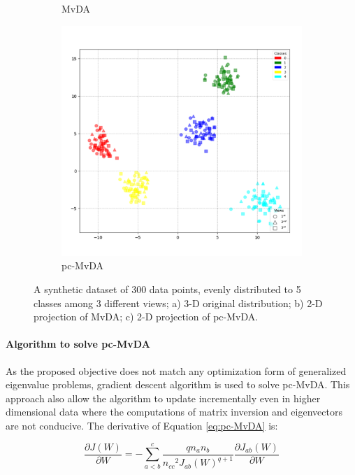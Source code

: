 \begin{figure}[htbp]
\begin{subfigure}{0.33\textwidth}
                \caption{MvDA}
            \end{subfigure}%
            \begin{subfigure}{0.33\textwidth}
                \centering
                \includegraphics[width=0.95\linewidth]{figs/Synthetic2_pc-MvDA.png}
                \caption{pc-MvDA}
            \end{subfigure}

            \caption{A synthetic dataset of 300 data points, evenly distributed to 5 classes among 3 different views; a) 3-D original distribution; b) 2-D projection of MvDA; c) 2-D projection of pc-MvDA.}
            \label{fig:synthetic2}
        \end{figure}


    \paragraph{Algorithm to solve pc-MvDA}
        As the proposed objective does not match any optimization form of generalized eigenvalue problems, gradient descent algorithm is used to solve pc-MvDA. This approach also allow the algorithm to update incrementally even in higher dimensional data where the computations of matrix inversion and eigenvectors are not conducive. The derivative of Equation \eqref{eq:pc-MvDA} is:

        \begin{equation}
            \frac{\partial J\left(W\right)}{\partial W}=-\sum_{a<b}^{c}{\frac{qn_an_b}{{n_{cc}}^2{J_{ab}\left(W\right)}^{q+1}}\frac{\partial J_{ab}\left(W\right)}{\partial W}}
        \end{equation}

